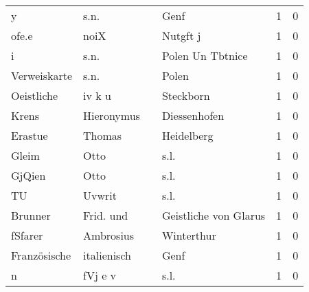 \begin{tabular}{llllrr}
                        y &                               s.n. &             &                                        Genf &          1 &         0 \\
                    ofe.e &                               noiX &             &                                    Nutgft j &          1 &         0 \\
                        i &                               s.n. &             &                            Polen Un Tbtnice &          1 &         0 \\
             Verweiskarte &                               s.n. &             &                                       Polen &          1 &         0 \\
               Oeistliche &                             iv k u &             &                                   Steckborn &          1 &         0 \\
                    Krens &                         Hieronymus &             &                                Diessenhofen &          1 &         0 \\
                  Erastue &                             Thomas &             &                                  Heidelberg &          1 &         0 \\
                    Gleim &                               Otto &             &                                        s.l. &          1 &         0 \\
                   GjQien &                               Otto &             &                                        s.l. &          1 &         0 \\
                       TU &                             Uvwrit &             &                                        s.l. &          1 &         0 \\
                  Brunner &                          Frid. und &             &                       Geistliche von Glarus &          1 &         0 \\
                  fSfarer &                          Ambrosius &             &                                  Winterthur &          1 &         0 \\
             Französische &                        italienisch &             &                                        Genf &          1 &         0 \\
                        n &                            fVj e v &             &                                        s.l. &          1 &         0 \\

\end{tabular}
